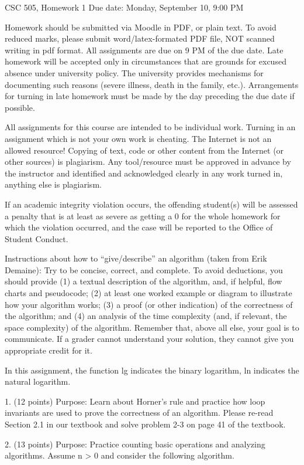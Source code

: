 CSC 505, Homework 1
Due date: Monday, September 10, 9:00 PM

Homework should be submitted via Moodle in PDF, or plain text. To avoid reduced marks, please submit word/latex-formated PDF file, NOT scanned writing in pdf format. All assignments are due on 9 PM of the due date. Late homework will be accepted only in circumstances that are grounds for excused absence under university policy. The university provides mechanisms for documenting such reasons (severe illness, death in the family, etc.). Arrangements for turning in late homework must be made by the day preceding the due date if possible.

All assignments for this course are intended to be individual work. Turning in an assignment which is not your own work is cheating. The Internet is not an allowed resource! Copying of text, code or other content from the Internet (or other sources) is plagiarism. Any tool/resource must be approved in advance by the instructor and identified and acknowledged clearly in any work turned in, anything else is plagiarism.

If an academic integrity violation occurs, the offending student(s) will be assessed a penalty that is at least as severe as getting a 0 for the whole homework for which the violation occurred, and the case will be reported to the Office of Student Conduct.

Instructions about how to “give/describe” an algorithm (taken from Erik Demaine): Try to be concise, correct, and complete. To avoid deductions, you should provide (1) a textual description of the algorithm, and, if helpful, flow charts and pseudocode; (2) at least one worked example or diagram to illustrate how your algorithm works; (3) a proof (or other indication) of the correctness of the algorithm; and (4) an analysis of the time complexity (and, if relevant, the space complexity) of the algorithm. Remember that, above all else, your goal is to communicate. If a grader cannot understand your solution, they cannot give you appropriate credit for it.

In this assignment, the function lg indicates the binary logarithm, ln indicates the natural logarithm.

1. (12 points) Purpose: Learn about Horner’s rule and practice how loop invariants are used to prove the correctness of an algorithm. Please re-read Section 2.1 in our textbook and solve problem 2-3 on page 41 of the textbook.

2. (13 points) Purpose: Practice counting basic operations and analyzing algorithms. Assume n > 0 and consider the following algorithm.

